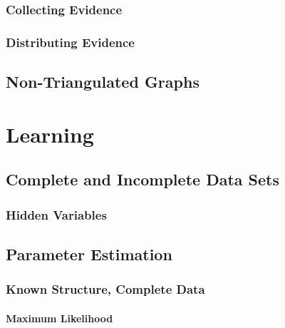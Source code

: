 
		\subsection{Collecting Evidence} %

		\subsection{Distributing Evidence} %

	\section{Non-Triangulated Graphs} %

\chapter{Learning} %

	\section{Complete and Incomplete Data Sets} %

		\subsection{Hidden Variables} %

	\section{Parameter Estimation} %

		\subsection{Known Structure, Complete Data} %

			\subsubsection{Maximum Likelihood} %

